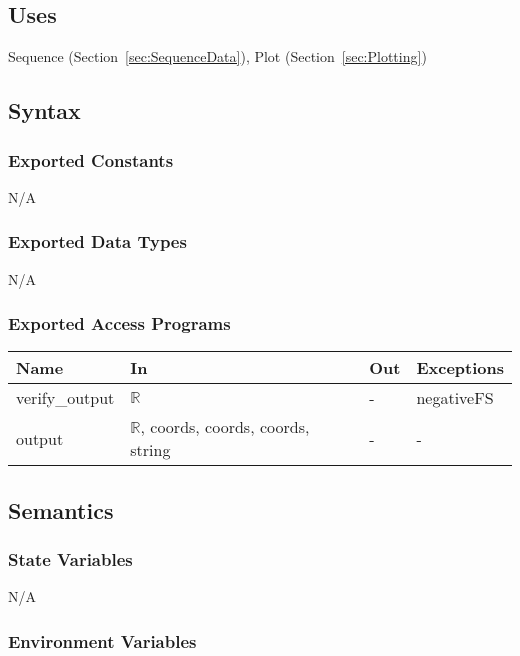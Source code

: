 \documentclass[12pt, titlepage]{article}
\begin{document}
\subsection{Uses}

Sequence (Section~\ref{sec:SequenceData}), Plot (Section~\ref{sec:Plotting})

\subsection{Syntax}

\subsubsection{Exported Constants}
N/A

\subsubsection{Exported Data Types}
N/A

\subsubsection{Exported Access Programs}

\begin{center}
	\renewcommand*{\arraystretch}{1.5}
	\begin{tabular} {p{}  p{}  p{} 
			p{} } \hline 
		\textbf{Name} & \textbf{In} & \textbf{Out} & \textbf{Exceptions} \\ 
		\hline
		
		verify\_output & $\mathbb{R}$ & - & negativeFS \\
		output & $\mathbb{R}$, coords, coords, coords, string & - & - \\ \hline
	\end{tabular}
\end{center}

\subsection{Semantics}

\subsubsection{State Variables}
N/A

\subsubsection{Environment Variables}
\end{document}
